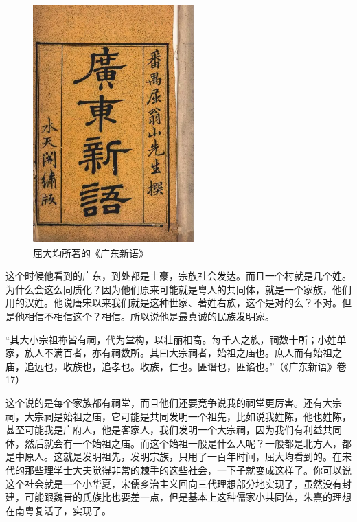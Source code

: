 \begin{figure}
	\centering
	\includegraphics[width=\textwidth]{images/image-60}
	\caption{屈大均所著的《广东新语》}
\end{figure}

这个时候他看到的广东，到处都是土豪，宗族社会发达。而且一个村就是几个姓。为什么会这么同质化？因为他们原来可能就是粤人的共同体，就是一个家族，他们用的汉姓。他说唐宋以来我们就是这种世家、著姓右族，这个是对的么？不对。但是他相信不相信这个？相信。所以说他是最真诚的民族发明家。

“其大小宗祖祢皆有祠，代为堂构，以壮丽相高。每千人之族，祠数十所；小姓单家，族人不满百者，亦有祠数所。其曰大宗祠者，始祖之庙也。庶人而有始祖之庙，追远也，收族也，追孝也。收族，仁也。匪谮也，匪谄也。”（《广东新语》卷17）

这个说的是每个家族都有祠堂，而且他们还要竞争说我的祠堂更厉害。还有大宗祠，大宗祠是始祖之庙，它可能是共同发明一个祖先，比如说我姓陈，他也姓陈，甚至可能我是广府人，他是客家人，我们发明一个大宗祠，因为我们有利益共同体，然后就会有一个始祖之庙。而这个始祖一般是什么人呢？一般都是北方人，都是中原人。这就是发明祖先，发明宗族，只用了一百年时间，屈大均看到的。在宋代的那些理学士大夫觉得非常的棘手的这些社会，一下子就变成这样了。你可以说这个社会就是一个小华夏，宋儒乡治主义回向三代理想部分地实现了，虽然没有封建，可能跟魏晋的氏族比也要差一点，但是基本上这种儒家小共同体，朱熹的理想在南粤复活了，实现了。

